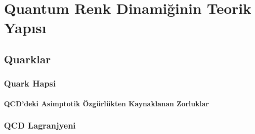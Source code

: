 \chapter{Quantum Renk Dinamiğinin Teorik Yapısı}
\section{Quarklar}
\lipsum[2-3]
\subsection{Quark Hapsi}
\lipsum[2-3]
\subsubsection{QCD'deki Asimptotik Özgürlükten Kaynaklanan Zorluklar}
\lipsum[2-3]
\subsection{QCD Lagranjyeni}
\lipsum[2-3]
